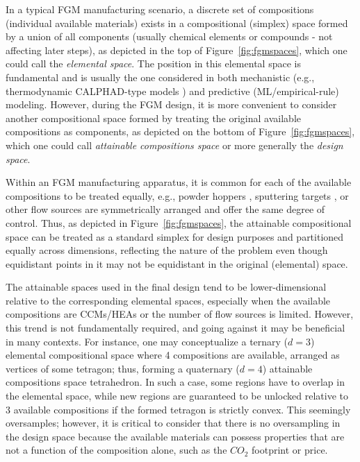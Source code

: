 In a typical FGM manufacturing scenario, a discrete set of compositions (individual available materials) exists in a compositional (simplex) space formed by a union of all components (usually chemical elements or compounds - not affecting later steps), as depicted in the top of Figure~\ref{fig:fgmspaces}, which one could call the \emph{elemental space}. The position in this elemental space is fundamental and is usually the one considered in both mechanistic (e.g., thermodynamic CALPHAD-type models \cite{Olson2023GenomicDynamics}) and predictive (ML/empirical-rule) modeling. However, during the FGM design, it is more convenient to consider another compositional space formed by treating the original available compositions as components, as depicted on the bottom of Figure~\ref{fig:fgmspaces}, which one could call \emph{attainable compositions space} or more generally the \emph{design space}.


Within an FGM manufacturing apparatus, it is common for each of the available compositions to be treated equally, e.g., powder hoppers \cite{Reichardt2021AdvancesMaterials}, sputtering targets \cite{Wu2023ATechnology}, or other flow sources are symmetrically arranged and offer the same degree of control. Thus, as depicted in Figure~\ref{fig:fgmspaces}, the attainable compositional space can be treated as a standard simplex for design purposes and partitioned equally across dimensions, reflecting the nature of the problem even though equidistant points in it may not be equidistant in the original (elemental) space.

The attainable spaces used in the final design tend to be lower-dimensional relative to the corresponding elemental spaces, especially when the available compositions are CCMs/HEAs or the number of flow sources is limited. However, this trend is not fundamentally required, and going against it may be beneficial in many contexts. For instance, one may conceptualize a ternary ($d=3$) elemental compositional space where 4 compositions are available, arranged as vertices of some tetragon; thus, forming a quaternary ($d=4$) attainable compositions space tetrahedron. In such a case, some regions have to overlap in the elemental space, while new regions are guaranteed to be unlocked relative to 3 available compositions if the formed tetragon is strictly convex. This seemingly oversamples; however, it is critical to consider that there is no oversampling in the design space because the available materials can possess properties that are not a function of the composition alone, such as the $CO_2$ footprint or price. 


